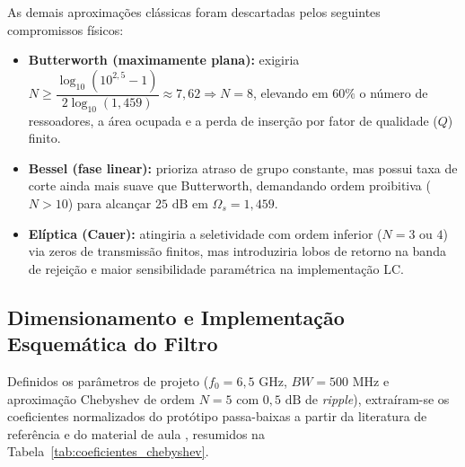 As demais aproximações clássicas foram descartadas pelos seguintes compromissos físicos:
\begin{itemize}
    \item \textbf{Butterworth (maximamente plana):} exigiria $N \ge \dfrac{\log_{10}(10^{2{,}5}-1)}{2\log_{10}(1{,}459)} \approx 7{,}62 \Rightarrow N = 8$, elevando em $60\%$ o número de ressoadores, a área ocupada e a perda de inserção por fator de qualidade ($Q$) finito.
    \item \textbf{Bessel (fase linear):} prioriza atraso de grupo constante, mas possui taxa de corte ainda mais suave que Butterworth, demandando ordem proibitiva ($N > 10$) para alcançar $25\text{ dB}$ em $\Omega_s = 1{,}459$.
    \item \textbf{Elíptica (Cauer):} atingiria a seletividade com ordem inferior ($N = 3$ ou $4$) via zeros de transmissão finitos, mas introduziria lobos de retorno na banda de rejeição e maior sensibilidade paramétrica na implementação LC.
\end{itemize}

\subsection{Dimensionamento e Implementação Esquemática do Filtro}

Definidos os parâmetros de projeto ($f_0 = 6{,}5\text{ GHz}$, $BW = 500\text{ MHz}$ e aproximação Chebyshev de ordem $N = 5$ com $0{,}5\text{ dB}$ de \textit{ripple}), extraíram-se os coeficientes normalizados do protótipo passa-baixas a partir da literatura de referência e do material de aula \cite{ludwig2000rf, schuartz2026slides}, resumidos na Tabela~\ref{tab:coeficientes_chebyshev}.

\begin{table}[htbp]
    \centering
    \footnotesize
    \caption{Coeficientes normalizados do protótipo passa-baixas Chebyshev ($0{,}5\text{ dB}$ de \textit{ripple}, $N = 5$) \cite{ludwig2000rf, schuartz2026slides}.}
    \label{tab:coeficientes_chebyshev}
\end{table}

